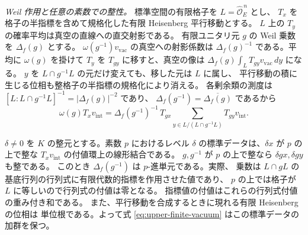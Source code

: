 \emph{Weil 作用と任意の素数での整性。}
標準空間の有限格子を \(L=\widehat{\mathcal O}_E^{\,n}\) とし、
\(T_x\) を格子の半指標を含めて規格化した有限 Heisenberg 平行移動とする。
\(L\) 上の \(T_y\) の確率平均は真空の直線への直交射影である。
有限ユニタリ元 \(g\) の Weil 乗数を \(\Delta_f(g)\) とする。
\(\omega(g^{-1})v_\mathrm{vac}\) の真空への射影係数は
\(\Delta_f(g)^{-1}\) である。平均に \(\omega(g)\) を掛けて
\(T_y\) を \(T_{gy}\) に移すと、真空の像は
\(\Delta_f(g)\int_L T_{gy}v_\mathrm{vac}\,dy\) になる。
\(y\) を \(L\cap g^{-1}L\) の元だけ変えても、移した元は \(L\) に属し、
平行移動の積に生じる位相も整格子の半指標の規格化により消える。
各剰余類の測度は
\([L:L\cap g^{-1}L]^{-1}=|\Delta_f(g)|^{-2}\) であり、
\(\Delta_f(g^{-1})=\overline{\Delta_f(g)}\) であるから
\begin{equation}\label{eq:upper-finite-vacuum}
 \omega(g)T_xv_\mathrm{int}=
 \Delta_f(g^{-1})^{-1}\,T_{gx}
       \sum_{y\in L/(L\cap g^{-1}L)}T_{gy}v_\mathrm{int}.
\end{equation}

\(\delta\ne0\) を \(K\) の整元とする。素数 \(p\) におけるレベル
\(\delta\) の標準データは、\(\delta x\) が \(p\) の上で整な
\(T_xv_\mathrm{int}\) の付値環上の線形結合である。
\(g,g^{-1}\) が \(p\) の上で整なら \(\delta gx,\delta gy\) も整である。
このとき \(\Delta_f(g^{-1})\) は \(p\)-進単元である。実際、
乗数は \(L\cap gL\) の基底行列の行列式に有限代数的指標を作用させた値であり、
\(p\) の上では格子が \(L\) に等しいので行列式の付値は零となる。
指標値の付値はこれらの行列式付値の重み付き和である。
また、平行移動を合成するときに現れる有限 Heisenberg の位相は
単位根である。よって式 \eqref{eq:upper-finite-vacuum} はこの標準データの加群を保つ。


